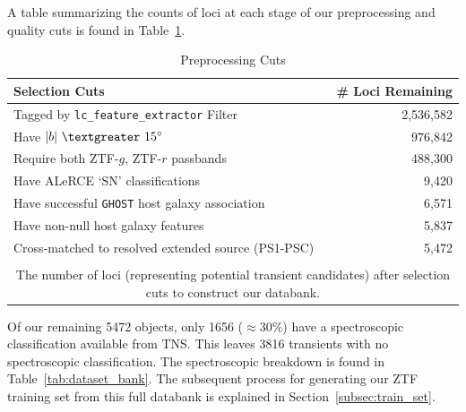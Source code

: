 \documentclass[twocolumn]{aastex63}
\begin{document}
A table summarizing the counts of loci at each stage of our preprocessing and quality cuts is found in Table~\ref{tab:preprocessing-cuts}.
\begin{table}
\centering
\caption{Preprocessing Cuts}
\label{tab:preprocessing-cuts}
\begin{tabular}{lr}
\hline
\textbf{Selection Cuts} & \textbf{\# Loci Remaining} \\
\hline
Tagged by \texttt{lc\_feature\_extractor} Filter & 2,536,582 \\
Have $|b|~\textgreater~15\degree$ & 976,842 \\
Require both ZTF-$g$, ZTF-$r$ passbands & 488,300 \\
Have ALeRCE `SN' classifications & 9,420 \\
Have successful \texttt{GHOST} host galaxy association & 6,571 \\
Have non-null host galaxy features & 5,837 \\
Cross-matched to resolved extended source (PS1-PSC) & 5,472 \\
\hline\\[-2.0ex]
\multicolumn{2}{c}{
\begin{minipage}{10cm}
The number of loci (representing potential transient candidates) after selection cuts to construct our databank.
\end{minipage}}
\end{tabular}
\end{table}

Of our remaining 5472 objects, only 1656 ($\approx$30\%) have a spectroscopic classification available from TNS. This leaves 3816 transients with no spectroscopic classification. The spectroscopic breakdown is found in Table~\ref{tab:dataset_bank}. The subsequent process for generating our ZTF training set from this full databank is explained in Section~\ref{subsec:train_set}.

\end{document}
